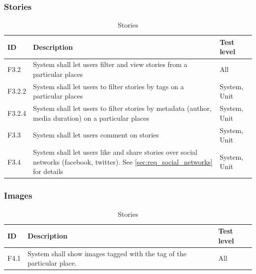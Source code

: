 \documentclass[11pt]{book}
\begin{document}
\subsubsection{Stories}

\begin{table}[H]
\centering
\begin{tabular}{ l  p{11cm} l }
    ID       & Description                                                                                              & Test level       \\ \hline
    F3.2     & System shall let users filter and view stories from a particular places                                  & All              \\ \hline
    F3.2.2   & System shall let users to filter stories by tags on a particular places                                  & System, Unit     \\ \hline
    F3.2.4   & System shall let users to filter stories by metadata (author, media duration) on a particular places     & System, Unit     \\ \hline
    F3.3     & System shall let users comment on stories                                                                & System, Unit     \\ \hline
    F3.4     & System shall let users like and share stories over social networks (facebook, twitter). 
               See \ref{sec:req_social_networks} for details                                                            & System, Unit     \\
    \end{tabular}
\caption{Stories}
\label{tab:req_stories}
\end{table}

\subsubsection{Images}

\begin{table}[H]
\centering
\begin{tabular}{ l  p{11cm} l }
    ID       & Description                                                                                              & Test level       \\ \hline
    F4.1     & System shall show images tagged with the tag of the particular place.                                    & All              \\
    \end{tabular}
\caption{Stories}
\label{tab:req_images}
\end{table}
\end{document}
